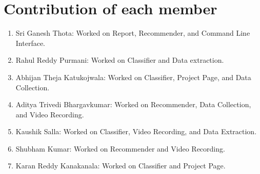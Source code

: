 \documentclass[a4paper, 24pt]{article}
\begin{document}
\section{Contribution of each member}
\label{sec:contribution}
\begin{enumerate}
\item Sri Ganesh Thota: Worked on Report, Recommender, and Command Line Interface.
\item Rahul Reddy Purmani: Worked on Classifier and Data extraction.
\item Abhijan Theja Katukojwala: Worked on Classifier, Project Page, and Data Collection.
\item Aditya Trivedi Bhargavkumar: Worked on Recommender, Data Collection, and Video Recording.
\item Kaushik Salla: Worked on Classifier, Video Recording, and Data Extraction.
\item Shubham Kumar: Worked on Recommender and Video Recording.
\item Karan Reddy Kanakanala: Worked on Classifier and Project Page.
\end{enumerate}
\end{document}
